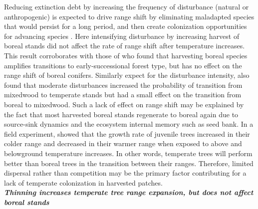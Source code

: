 Reducing extinction debt by increasing the frequency of disturbance
(natural or anthropogenic) is expected to drive range shift by
eliminating maladapted species that would persist for a long period, and
then create colonization opportunities for advancing species
\citep{Renwick2015, Kuparinen2010}. Here intensifying disturbance by
increasing harvest of boreal stands did not affect the rate of range
shift after temperature increases. This result corroborates with those
of \citet{Vanderwel2014} who found that harvesting boreal species
amplifies transitions to early-successional forest type, but has no
effect on the range shift of boreal conifers. Similarly expect for the
disturbance intensity, \citet{Brice2020} also found that moderate
disturbances increased the probability of transition from mixedwood to
temperate stands but had a small effect on the transition from boreal to
mixedwood. Such a lack of effect on range shift may be explained by the
fact that most harvested boreal stands regenerate to boreal again due to
source-sink dynamics and the ecosystem internal memory such as seed
bank. In a field experiment, \citet{Reich2015} showed that the growth
rate of juvenile trees increased in their colder range and decreased in
their warmer range when exposed to above and belowground temperature
increases. In other words, temperate trees will perform better than
boreal trees in the transition between their ranges. Therefore, limited
dispersal rather than competition may be the primary factor contributing
for a lack of temperate colonization in harvested patches.\\

\textbf{\emph{Thinning increases temperate tree range expansion, but
does not affect boreal stands}}

